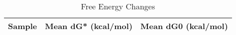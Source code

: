 \documentclass{article}
\begin{document}
\begin{table}[ht]
    \centering
    \begin{tabular}{|c|c|c|}
    \hline
    Sample & Mean dG* (kcal/mol) & Mean dG0 (kcal/mol) \\
    \hline
    \hline
    \end{tabular}
    \caption{Free Energy Changes}
\end{table}
\end{document}
